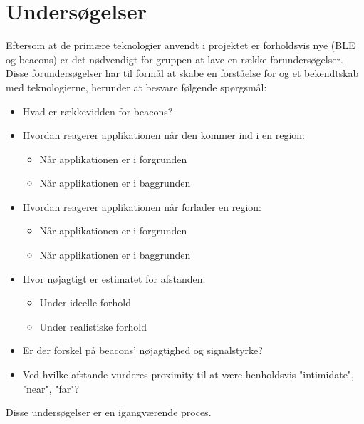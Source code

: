 \chapter{Undersøgelser}
Eftersom at de primære teknologier anvendt i projektet er forholdsvis nye (BLE og beacons) er det nødvendigt for gruppen at lave en række forundersøgelser. Disse forundersøgelser har til formål at skabe en forståelse for og et bekendtskab med teknologierne, herunder at besvare følgende spørgsmål:
\begin{itemize}
\item Hvad er rækkevidden for beacons?
\item Hvordan reagerer applikationen når den kommer ind i en region:
\begin{itemize}
\item Når applikationen er i forgrunden
\item Når applikationen er i baggrunden
\end{itemize}
\item Hvordan reagerer applikationen når forlader en region:
\begin{itemize}
\item Når applikationen er i forgrunden
\item Når applikationen er i baggrunden
\end{itemize}
\item Hvor nøjagtigt er estimatet for afstanden:
\begin{itemize}
\item Under ideelle forhold
\item Under realistiske forhold
\end{itemize}
\item Er der forskel på beacons' nøjagtighed og signalstyrke?
\item Ved hvilke afstande vurderes proximity til at være henholdsvis "intimidate", "near", "far"?
\end{itemize}

Disse undersøgelser er en igangværende proces.